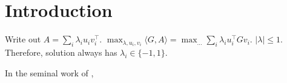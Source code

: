 
\section{Introduction}

Write out $A = \sum_i \lambda_i u_i v_i^\top$. $\max_{\lambda, u_i,v_i} \langle G, A \rangle = \max_{\dots} \sum_i \lambda_i u_i^\top G v_i$. $|\lambda| \le 1$. 
Therefore, solution always has $\lambda_i \in \{-1,1\}$.

In the seminal work of \cite{agrachev2008input},

    
